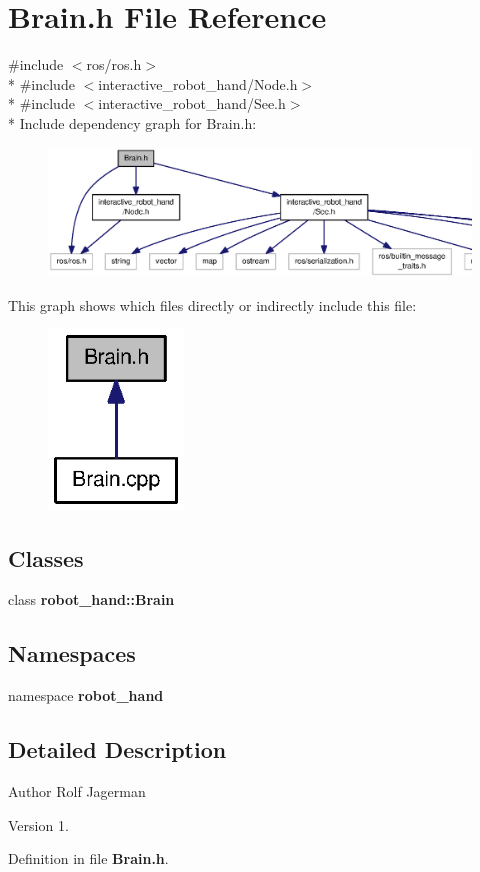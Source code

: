 \section{Brain.\-h File Reference}
\label{Brain_8h}
{\ttfamily \#include $<$ros/ros.\-h$>$}\\*
{\ttfamily \#include $<$interactive\-\_\-robot\-\_\-hand/\-Node.\-h$>$}\\*
{\ttfamily \#include $<$interactive\-\_\-robot\-\_\-hand/\-See.\-h$>$}\\*
Include dependency graph for Brain.\-h\-:\nopagebreak
\begin{figure}[H]
\begin{center}
\leavevmode
\includegraphics[width=350pt]{Brain_8h__incl}
\end{center}
\end{figure}
This graph shows which files directly or indirectly include this file\-:\nopagebreak
\begin{figure}[H]
\begin{center}
\leavevmode
\includegraphics[width=102pt]{Brain_8h__dep__incl}
\end{center}
\end{figure}
\subsection*{Classes}
\begin{DoxyCompactItemize}
\item 
class {\bf robot\-\_\-hand\-::\-Brain}
\end{DoxyCompactItemize}
\subsection*{Namespaces}
\begin{DoxyCompactItemize}
\item 
namespace {\bf robot\-\_\-hand}
\end{DoxyCompactItemize}


\subsection{Detailed Description}
\begin{DoxyAuthor}{Author}
Rolf Jagerman 
\end{DoxyAuthor}
\begin{DoxyVersion}{Version}
1. 
\end{DoxyVersion}


Definition in file {\bf Brain.\-h}.

